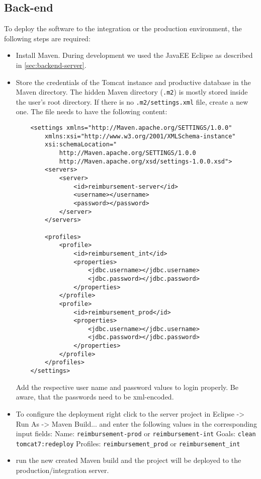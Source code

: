 \subsection{Back-end}

To deploy the software to the integration or the production environment, the following steps are required:

\begin{itemize}
    \item Install Maven. During development we used the JavaEE Eclipse as described in  \ref{sec:backend-server}.
    \item Store the credentials of the Tomcat instance and productive database in the Maven directory. The hidden Maven directory (\texttt{.m2}) is mostly stored inside the user's root directory. If there is no \texttt{.m2/settings.xml} file, create a new one. The file needs to have the following content:

    \begin{lstlisting}
    <settings xmlns="http://Maven.apache.org/SETTINGS/1.0.0"
        xmlns:xsi="http://www.w3.org/2001/XMLSchema-instance"
        xsi:schemaLocation="
            http://Maven.apache.org/SETTINGS/1.0.0
            http://Maven.apache.org/xsd/settings-1.0.0.xsd">
    	<servers>
    		<server>
    			<id>reimbursement-server</id>
    			<username></username>
    			<password></password>
    		</server>
    	</servers>

    	<profiles>
    		<profile>
    			<id>reimbursement_int</id>
    			<properties>
    				<jdbc.username></jdbc.username>
    				<jdbc.password></jdbc.password>
    			</properties>
    		</profile>
    		<profile>
    			<id>reimbursement_prod</id>
    			<properties>
    				<jdbc.username></jdbc.username>
    				<jdbc.password></jdbc.password>
    			</properties>
    		</profile>
    	</profiles>
    </settings>
    \end{lstlisting}

    Add the respective user name and password values to login properly. Be aware, that the passwords need to be xml-encoded.

    \item To configure the deployment right click to the server project in Eclipse -> Run As -> Maven Build... and enter the following values in the corresponding input fields:
    \newline
    Name: \texttt{reimbursement-prod} or  \texttt{reimbursement-int}
    \newline
    Goals: \texttt{clean tomcat7:redeploy}
    \newline
    Profiles: \texttt{reimbursement\_prod} or \texttt{reimbursement\_int}
    \item run the new created Maven build and the project will be deployed to the production/integration server.

\end{itemize}

